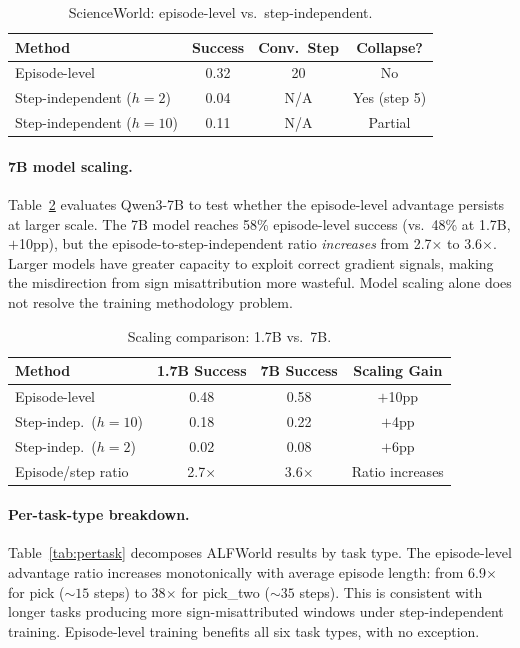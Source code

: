 \documentclass[10pt]{article}
\begin{document}
\begin{table}[h]
\centering
\caption{ScienceWorld: episode-level vs.\ step-independent.}
\label{tab:scienceworld}
\begin{tabular}{lccc}
\toprule
Method & Success & Conv.\ Step & Collapse? \\
\midrule
Episode-level             & 0.32 & 20  & No \\
Step-independent ($h{=}2$)  & 0.04 & N/A & Yes (step 5) \\
Step-independent ($h{=}10$) & 0.11 & N/A & Partial \\
\bottomrule
\end{tabular}
\end{table}

\paragraph{7B model scaling.}
Table~\ref{tab:scaling} evaluates Qwen3-7B to test whether the episode-level advantage persists at larger scale. The 7B model reaches 58\% episode-level success (vs.\ 48\% at 1.7B, $+$10pp), but the episode-to-step-independent ratio \emph{increases} from 2.7$\times$ to 3.6$\times$. Larger models have greater capacity to exploit correct gradient signals, making the misdirection from sign misattribution more wasteful. Model scaling alone does not resolve the training methodology problem.

\begin{table}[h]
\centering
\caption{Scaling comparison: 1.7B vs.\ 7B.}
\label{tab:scaling}
\begin{tabular}{lccc}
\toprule
Method & 1.7B Success & 7B Success & Scaling Gain \\
\midrule
Episode-level             & 0.48 & 0.58 & $+$10pp \\
Step-indep.\ ($h{=}10$)  & 0.18 & 0.22 & $+$4pp \\
Step-indep.\ ($h{=}2$)   & 0.02 & 0.08 & $+$6pp \\
\midrule
Episode/step ratio        & 2.7$\times$ & 3.6$\times$ & Ratio increases \\
\bottomrule
\end{tabular}
\end{table}

\paragraph{Per-task-type breakdown.}
Table~\ref{tab:pertask} decomposes ALFWorld results by task type. The episode-level advantage ratio increases monotonically with average episode length: from 6.9$\times$ for pick (${\sim}15$ steps) to 38$\times$ for pick\_two (${\sim}35$ steps). This is consistent with longer tasks producing more sign-misattributed windows under step-independent training. Episode-level training benefits all six task types, with no exception.
\end{document}
